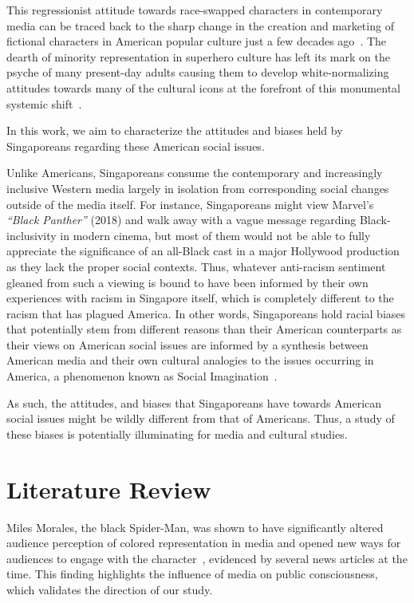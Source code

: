 \documentclass[%
 reprint,
 amsmath,amssymb,
 12pt,
rmp,
]{revtex4-2}
\begin{document}
This regressionist attitude towards race-swapped characters in contemporary media can be traced back to the sharp change in the creation and marketing of fictional characters in American popular culture just a few decades ago~\cite{fu_fear_2015}. The dearth of minority representation in superhero culture has left its mark on the psyche of many present-day adults causing them to develop white-normalizing attitudes towards many of the cultural icons at the forefront of this monumental systemic shift~\cite{holtzman_media_2014}.

In this work, we aim to characterize the attitudes and biases held by Singaporeans regarding these American social issues.

Unlike Americans, Singaporeans consume the contemporary and increasingly inclusive Western media largely in isolation from corresponding social changes outside of the media itself. For instance, Singaporeans might view Marvel’s \emph{“Black Panther”} (2018) and walk away with a vague message regarding Black-inclusivity in modern cinema, but most of them would not be able to fully appreciate the significance of an all-Black cast in a major Hollywood production as they lack the proper social contexts. Thus, whatever anti-racism sentiment gleaned from such a viewing is bound to have been informed by their own experiences with racism in Singapore itself, which is completely different to the racism that has plagued America. In other words, Singaporeans hold racial biases that potentially stem from different reasons than their American counterparts as their views on American social issues are informed by a synthesis between American media and their own cultural analogies to the issues occurring in America, a phenomenon known as Social Imagination~\cite{social_imag_1, social_imag_2}. 

As such, the attitudes, and biases that Singaporeans have towards American social issues might be wildly different from that of Americans. Thus, a study of these biases is potentially illuminating for media and cultural studies.

\section{\label{sec:lit-review}Literature Review}

Miles Morales, the black Spider-Man, was shown to have significantly altered audience perception of colored representation in media and opened new ways for audiences to engage with the character~\cite{mcwilliams_who_2013}, evidenced by several news articles at the time. This finding highlights the influence of media on public consciousness, which validates the direction of our study.
\end{document}
